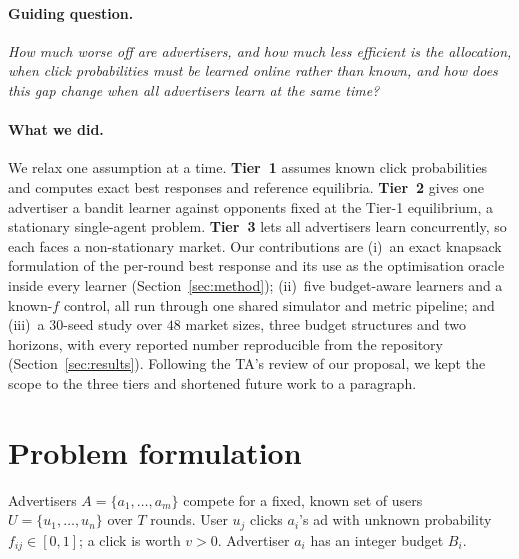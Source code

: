 \documentclass{article}
\theoremstyle{definition}
\begin{document}
\paragraph{Guiding question.} \emph{How much worse off are advertisers, and how much less efficient is the
allocation, when click probabilities must be learned online rather than known, and how does this gap
change when all advertisers learn at the same time?}

\paragraph{What we did.} We relax one assumption at a time. \textbf{Tier~1} assumes known click
probabilities and computes exact best responses and reference equilibria. \textbf{Tier~2} gives one
advertiser a bandit learner against opponents fixed at the Tier-1 equilibrium, a stationary single-agent
problem. \textbf{Tier~3} lets all advertisers learn concurrently, so each faces a non-stationary market.
Our contributions are (i)~an exact knapsack formulation of the per-round best response and its use as the
optimisation oracle inside every learner (Section~\ref{sec:method}); (ii)~five budget-aware learners and a
known-$f$ control, all run through one shared simulator and metric pipeline; and (iii)~a $30$-seed study
over $48$ market sizes, three budget structures and two horizons, with every reported number reproducible
from the repository (Section~\ref{sec:results}). Following the TA's review of our proposal, we kept the
scope to the three tiers and shortened future work to a paragraph.

\section{Problem formulation}\label{sec:model}
Advertisers $A=\{a_1,\dots,a_m\}$ compete for a fixed, known set of users $U=\{u_1,\dots,u_n\}$ over
$T$ rounds. User $u_j$ clicks $a_i$'s ad with unknown probability $f_{ij}\in[0,1]$; a click is worth $v>0$.
Advertiser $a_i$ has an integer budget $B_i$.
\end{document}
